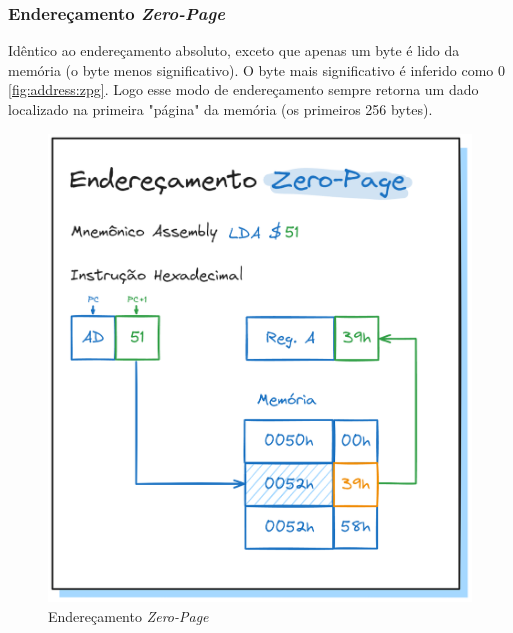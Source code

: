\documentclass[
	12pt,				  %
	openright,		%
	a4paper,			%
	english,			%
	french,				%
	spanish,			%
	brazil,				%
]{abntex2}
\begin{document}
\subsubsection{Endereçamento \emph{Zero-Page}}
Idêntico ao endereçamento absoluto, exceto que apenas um byte é lido da memória
(o byte menos significativo). O byte mais significativo é inferido como 0
\autoref{fig:address:zpg}. Logo esse modo de endereçamento sempre retorna um
dado localizado na primeira "página" da memória (os primeiros 256 bytes).
\begin{figure}[h]
	\centering
	\caption{Endereçamento \emph{Zero-Page}} \label{fig:address:zpg}
	\includegraphics[scale=0.25]{../assets/img/addressing-modes-zpg.png}
\end{figure}
\end{document}
